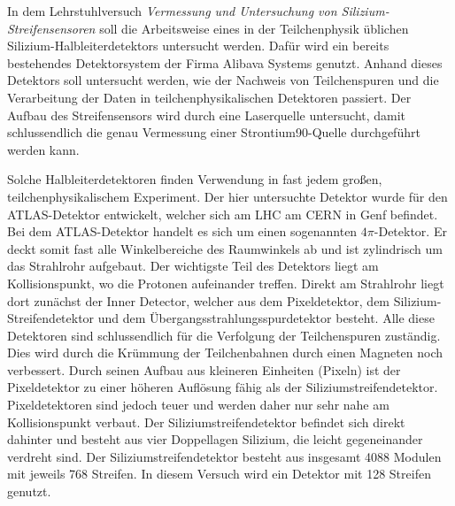 In dem Lehrstuhlversuch \textit{Vermessung und Untersuchung von Silizium-Streifensensoren} soll die Arbeitsweise eines in der Teilchenphysik üblichen Silizium-Halbleiterdetektors untersucht werden.
Dafür wird ein bereits bestehendes Detektorsystem der Firma Alibava Systems genutzt.
Anhand dieses Detektors soll untersucht werden, wie der Nachweis von Teilchenspuren und die Verarbeitung der Daten in teilchenphysikalischen Detektoren passiert.
Der Aufbau des Streifensensors wird durch eine Laserquelle untersucht, damit schlussendlich die genau Vermessung einer Strontium90-Quelle durchgeführt werden kann.

Solche Halbleiterdetektoren finden Verwendung in fast jedem großen, teilchenphysikalischem Experiment.
Der hier untersuchte Detektor wurde für den ATLAS-Detektor entwickelt, welcher sich am LHC am CERN in Genf befindet.
Bei dem ATLAS-Detektor handelt es sich um einen sogenannten $4\pi$-Detektor.
Er deckt somit fast alle Winkelbereiche des Raumwinkels ab und ist zylindrisch um das Strahlrohr aufgebaut.
Der wichtigste Teil des Detektors liegt am Kollisionspunkt, wo die Protonen aufeinander treffen.
Direkt am Strahlrohr liegt dort zunächst der Inner Detector, welcher aus dem Pixeldetektor, dem Silizium-Streifendetektor und dem Übergangsstrahlungsspurdetektor besteht.
Alle diese Detektoren sind schlussendlich für die Verfolgung der Teilchenspuren zuständig.
Dies wird durch die Krümmung der Teilchenbahnen durch einen Magneten noch verbessert.
Durch seinen Aufbau aus kleineren Einheiten (Pixeln) ist der Pixeldetektor zu einer höheren Auflösung fähig als der Siliziumstreifendetektor.
Pixeldetektoren sind jedoch teuer und werden daher nur sehr nahe am Kollisionspunkt verbaut.
Der Siliziumstreifendetektor befindet sich direkt dahinter und besteht aus vier Doppellagen Silizium, die leicht gegeneinander verdreht sind.
Der Siliziumstreifendetektor besteht aus insgesamt 4088 Modulen mit jeweils 768 Streifen.
In diesem Versuch wird ein Detektor mit 128 Streifen genutzt.
